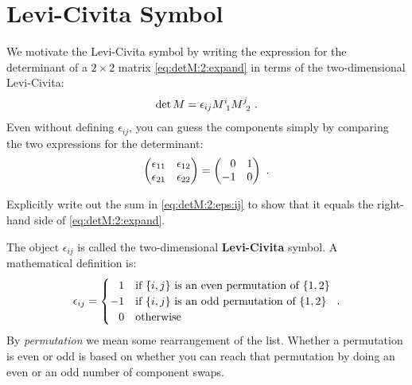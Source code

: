 \section{Levi-Civita Symbol}

We motivate the Levi-Civita symbol by writing the expression for the determinant of a $2\times 2$ matrix \eqref{eq:detM:2:expand} in terms of the two-dimensional Levi-Civita:
\begin{align}
    \det M = \epsilon_{ij}M\aij{i}{1} M\aij{j}{2} \ .
    \label{eq:detM:2:eps:ij}
\end{align}
Even without defining $\epsilon_{ij}$, you can guess the components simply by comparing the two expressions for the determinant:
\begin{align}
    \begin{pmatrix}
        \epsilon_{11} & \epsilon_{12} \\
        \epsilon_{21} & \epsilon_{22} 
    \end{pmatrix}
    =
    \begin{pmatrix}
        \pp 0 & 1 \\
        -1 & 0
    \end{pmatrix} \ .
\end{align}
% 
\begin{exercise}
Explicitly write out the sum in \eqref{eq:detM:2:eps:ij} to show that it equals the right-hand side of \eqref{eq:detM:2:expand}.
\end{exercise}
% 
The object $\epsilon_{ij}$ is called the two-dimensional \textbf{Levi-Civita} symbol. A mathematical definition is:
\begin{align}
    \epsilon_{ij} = 
    \begin{cases}
    \pp 1 &\text{if }\{i,j\}\text{ is an even permutation of }\{1,2\}\\
    -1 &\text{if }\{i,j\}\text{ is an odd permutation of }\{1,2\}\\
    \pp 0 &\text{otherwise}
    \end{cases}
    \ .
\end{align}
By \emph{permutation} we mean some rearrangement of the list. Whether a permutation is even or odd is based on whether you can reach that permutation by doing an even or an odd number of component swaps.

